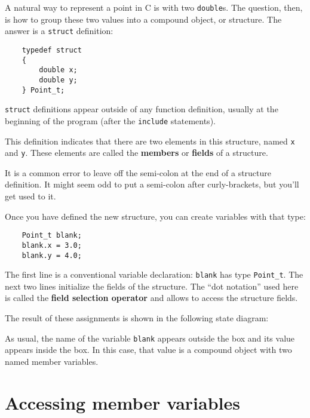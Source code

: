 A natural way to represent a point in C is with two {\tt double}s.
The question, then, is how to group these two values into
a compound object, or structure.  The answer is a {\tt struct}
definition:

\begin{verbatim}
	typedef struct 
	{
		double x;
		double y;
	} Point_t;  
\end{verbatim}
%
{\tt struct} definitions appear outside of any function definition,
usually at the beginning of the program (after the {\tt include}
statements).

This definition indicates that there are two elements in this
structure, named {\tt x} and {\tt y}.  These elements are called
the {\bf members} or {\bf fields} of a structure.

It is a common error to leave off the semi-colon at the end of a
structure definition.  It might seem odd to put a semi-colon after
curly-brackets, but you'll get used to it.

Once you have defined the new structure, you can create variables
with that type:

\begin{verbatim}
	Point_t blank;
	blank.x = 3.0;
	blank.y = 4.0;   
\end{verbatim}
%
The first line is a conventional variable declaration: {\tt blank} has
type {\tt Point\_t}.  The next two lines initialize the fields of the
structure.  The ``dot notation'' used here is called the {\bf field selection
	operator} and allows to access the structure fields.


The result of these assignments is shown in the following
state diagram:

\vspace{0.1in}
\centerline{}
\vspace{0.1in}

As usual, the name of the variable {\tt blank} appears outside the box
and its value appears inside the box.  In this case, that value is
a compound object with two named member variables.

\section{Accessing member variables}

